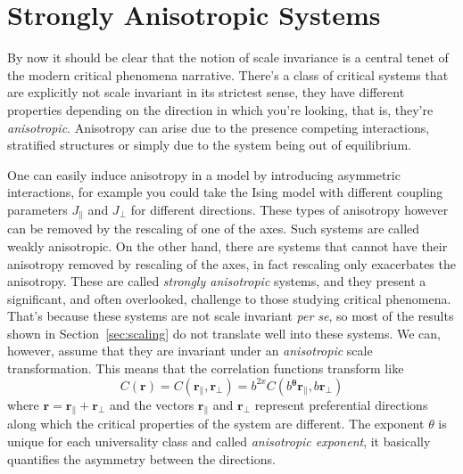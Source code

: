\section{Strongly Anisotropic Systems}
\label{ch:anis}

By now it should be clear that the notion of scale invariance is a central
tenet of the modern critical phenomena narrative. There's a class of critical
systems that are explicitly not scale invariant in its strictest sense, they
have different properties depending on the direction in which you're looking,
that is, they're \textit{anisotropic}. Anisotropy can arise due to the presence
competing interactions, stratified structures or simply due to the system being
out of equilibrium.

One can easily induce anisotropy in a model by introducing asymmetric
interactions, for example you could take the Ising model with different
coupling parameters $J_\parallel$ and $J_\perp$ for different directions. These
types of anisotropy however can be removed by the rescaling of one of the axes.
Such systems are called weakly anisotropic. On the other hand, there are
systems that cannot have their anisotropy removed by rescaling of the axes, in
fact rescaling only exacerbates the anisotropy. These are called
\textit{strongly anisotropic} systems, and they present a significant, and
often overlooked, challenge to those studying critical phenomena. That's because
these systems are not scale invariant \textit{per se}, so most of the results
shown in Section~\ref{sec:scaling} do not translate well into these systems.
We can, however, assume that they are invariant under an \textit{anisotropic}
scale transformation. This means that the correlation functions transform like
\begin{equation}
    C\left(\mathbf{r}\right)=
    C\left(\mathbf{r}_{\parallel},\mathbf{r}_{\perp}\right)=
    b^{2x}C\left(b\mathbf{^{\theta}r}_{\parallel},b\mathbf{r}_{\perp}\right)
\end{equation}
where $\mathbf{r}=\mathbf{r}_{\parallel}+\mathbf{r}_{\perp}$ and the vectors
$\mathbf{r}_{\parallel}$ and $\mathbf{r}_{\perp}$ represent preferential
directions along which the critical properties of the system are different. The
exponent $\theta$ is unique for each universality class and called
\textit{anisotropic exponent}, it basically quantifies the asymmetry between
the directions.

